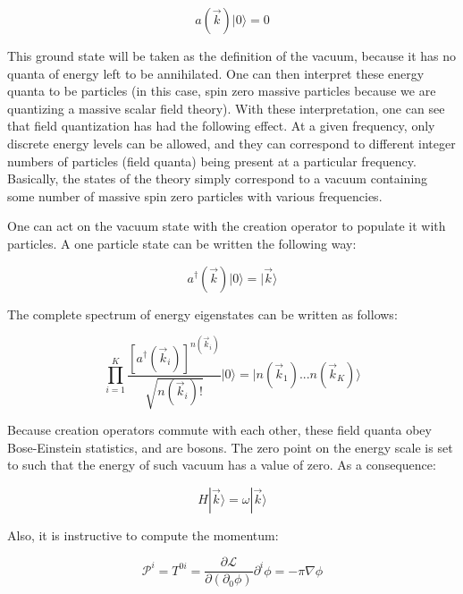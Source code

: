 \documentclass{article}
\begin{document}
    \begin{equation}
        a(\vec{k}) | 0 \rangle = 0
    \end{equation}

    This ground state will be taken as the definition of the vacuum, because it has no quanta of energy left to be annihilated. One can then interpret
    these energy quanta to be particles (in this case, spin zero massive particles because we are quantizing a massive scalar field theory). With these
    interpretation, one can see that field quantization has had the following effect. At a given frequency, only discrete energy levels can be allowed,
    and they can correspond to different integer numbers of particles (field quanta) being present at a particular frequency. Basically, the states of
    the theory simply correspond to a vacuum containing some number of massive spin zero particles with various frequencies.

    One can act on the vacuum state with the creation operator to populate it with particles. A one particle state can be written the following way:

    \begin{equation}
        a^{\dag}(\vec{k}) | 0 \rangle = | \vec{k} \rangle
    \end{equation}

    The complete spectrum of energy eigenstates can be written as follows:

    \begin{equation}
        \prod_{i = 1}^{K} \frac{[a^{\dag}(\vec{k}_{i})]^{n (\vec{k}_{i})}}{\sqrt{n (\vec{k}_{i})!}} | 0 \rangle = | n(\vec{k}_{1})...n(\vec{k}_{K}) \rangle
    \end{equation}

    Because creation operators commute with each other, these field quanta obey Bose-Einstein statistics, and are bosons. The zero point on the energy scale is
    set to such that the energy of such vacuum has a value of zero. As a consequence:

    \begin{equation}
        H | \vec{k} \rangle = \omega | \vec{k} \rangle
    \end{equation}

    Also, it is instructive to compute the momentum:

    \begin{equation}
        \mathcal{P}^{i} = T^{0 i} = \frac{\partial \mathcal{L}}{\partial (\partial_0 \phi)} \partial^{i} \phi = - \pi \nabla \phi
    \end{equation}
\end{document}
